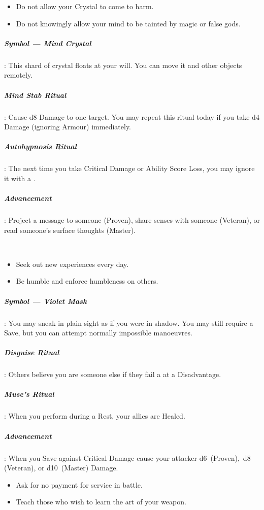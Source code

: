 \documentclass[itdr]{subfiles}
\begin{document}
{\em\begin{itemize}
		\item Do not allow your Crystal to come to harm.
		\item Do not knowingly allow your mind to be tainted by magic or false gods.
\end{itemize}}

\subparagraph{Symbol --- Mind Crystal}: This shard of crystal floats at your will. You can move it and other objects remotely.

\subparagraph{Mind Stab Ritual}: Cause d8 Damage to one target. You may repeat this ritual today if you take d4 Damage (ignoring Armour) immediately.

\subparagraph{Autohypnosis Ritual}: The next time you take Critical Damage or Ability Score Loss, you may ignore it with a .

\subparagraph{Advancement}: Project a message to someone (Proven), share senses with someone (Veteran), or read someone's surface thoughts (Master).

~

{\em\begin{itemize}
		\item Seek out new experiences every day.
		\item Be humble and enforce humbleness on others.
\end{itemize}}

\subparagraph{Symbol --- Violet Mask}: You may sneak in plain sight as if you were in shadow. You may still require a Save, but you can attempt normally impossible manoeuvres.

\subparagraph{Disguise Ritual}: Others believe you are someone else if they fail a  at a Disadvantage.

\subparagraph{Muse's Ritual}: When you perform during a Rest, your allies are Healed.

\subparagraph{Advancement}: When you Save against Critical Damage cause your attacker d6~(Proven),~d8 (Veteran), or d10~(Master) Damage.

\vfill
\break

{\em\begin{itemize}
		\item Ask for no payment for service in battle.
		\item Teach those who wish to learn the art of your weapon.
\end{itemize}}
\end{document}
